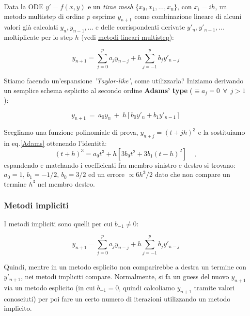 Data la ODE $y' = f(x,y)$ e un \emph{time mesh} $\{ x_0, x_1, \dots, x_n \}$, con $x_i=ih$, un metodo multistep di ordine $p$ esprime $y_{n+1}$ come combinazione lineare di alcuni valori già calcolati $y_n, y_{n-1}, \dots$ e delle corrispondenti derivate $y'_n, y'_{n-1}, \dots$ moltiplicate per lo step $h$ (vedi \href{https://en.wikipedia.org/wiki/Linear_multistep_method}{metodi lineari multistep}): 

\begin{equation}\label{multistep}
	\boxed{y_{n+1} = \sum^p_{j=0} a_j y_{n-j} + h\sum^p_{j=-1} b_j y'_{n-j}}
\end{equation}

Stiamo facendo un'espansione \emph{'Taylor-like'}, come utilizzarla? Iniziamo derivando un semplice schema esplicito al secondo ordine \textbf{Adams' type} ($\equiv a_j = 0\ \ \forall\ \ j>1$):

\begin{equation}\label{Adams}
	y_{n+1}\ =\ a_0 y_n\ +\ h\left[ b_0y'_n + b_1y'_{n-1} \right]
\end{equation}

Scegliamo una funzione polinomiale di prova, $y_{n+j}=(t+jh)^3$ e la sostituiamo in eq.\ref{Adams} ottenendo l'identità:
\[(t+h)^3 = a_0t^3 + h[3b_0t^2 + 3 b_1 (t-h)^2] \ \ \ \ \ ,\]
espandendo e matchando i coefficienti fra membro sinistro e destro si trovano: $a_0 = 1$, $b_1=-1/2$, $b_0 = 3/2$ ed un errore $\propto 6h^3/2$ dato che non compare un termine $h^3$ nel membro destro. 


%
%
\vspace{1cm}
\subsubsection{Metodi impliciti}
I metodi impliciti sono quelli per cui $b_{-1}\neq 0$:

\begin{equation}
	y_{n+1} = \sum^p_{j=0} a_j y_{n-j} + h\sum^p_{j=-1} b_j y'_{n-j}
\end{equation}

Quindi, mentre in un metodo esplicito non comparirebbe a destra un termine con $y'_{n+1}$, nei metodi impliciti compare. 
Normalmente, si fa un guess del nuovo $y_{n+1}$ via un metodo esplicito (in cui $b_{-1}=0$, quindi calcoliamo $y_{n+1}$ tramite valori conosciuti) per poi fare un certo numero di iterazioni utilizzando un metodo implicito.



%
%
\vspace{1cm}
